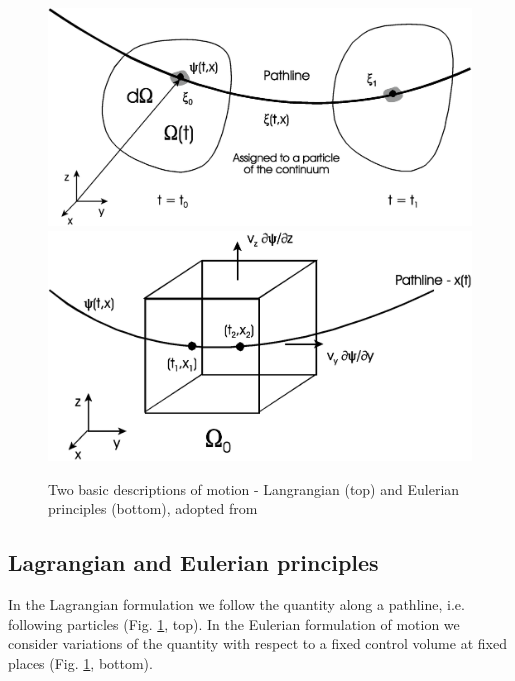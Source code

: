 
\begin{figure}[htb!]
\begin{center}
\footnotesize
\includegraphics[width=0.8\columnwidth]{figures/mech1.eps}
\includegraphics[width=0.8\columnwidth]{figures/mech2.eps}
\caption{Two basic descriptions of motion - Langrangian (top) and Eulerian principles (bottom), adopted from \cite{Kol:02}}
\label{fig:Euler-Langrange}
\end{center}
\end{figure}

\subsection{Lagrangian and Eulerian principles}
\label{sec:euler_lagrange}

In the {Lagrangian formulation} we
follow the quantity along a pathline, i.e. following particles
(Fig. \ref{fig:Euler-Langrange}, top). In the {Eulerian
formulation} of motion we consider
variations of the quantity with respect to a fixed control
volume at fixed places (Fig.
\ref{fig:Euler-Langrange}, bottom).

